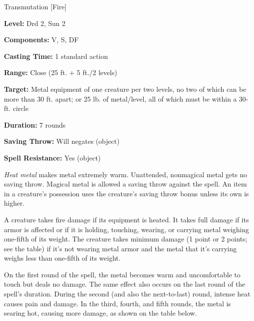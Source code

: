
Transmutation [Fire]

\textbf{Level:} Drd 2, Sun 2

\textbf{Components:} V, S, DF

\textbf{Casting Time:} 1 standard action

\textbf{Range:} Close (25 ft. + 5 ft./2 levels)

\textbf{Target:} Metal equipment of one creature per two levels, no two of which 
can be more than 30 ft. apart; or 25 lb. of metal/level, all of which must be within 
a 30-ft. circle

\textbf{Duration:} 7 rounds

\textbf{Saving Throw:} Will negates (object)

\textbf{Spell Resistance:} Yes (object)

\textit{Heat metal} makes metal extremely warm. Unattended, nonmagical metal gets 
no saving throw. Magical metal is allowed a saving throw against the spell. An 
item in a creature's possession uses the creature's saving throw bonus unless its 
own is higher.

A creature takes fire damage if its equipment is heated. It takes full damage if 
its armor is affected or if it is holding, touching, wearing, or carrying metal 
weighing one-fifth of its weight. The creature takes minimum damage (1 point or 
2 points; see the table) if it's not wearing metal armor and the metal that it's 
carrying weighs less than one-fifth of its weight.

On the first round of the spell, the metal becomes warm and uncomfortable to touch 
but deals no damage. The same effect also occurs on the last round of the spell's 
duration. During the second (and also the next-to-last) round, intense heat causes 
pain and damage. In the third, fourth, and fifth rounds, the metal is searing hot, 
causing more damage, as shown on the table below.

